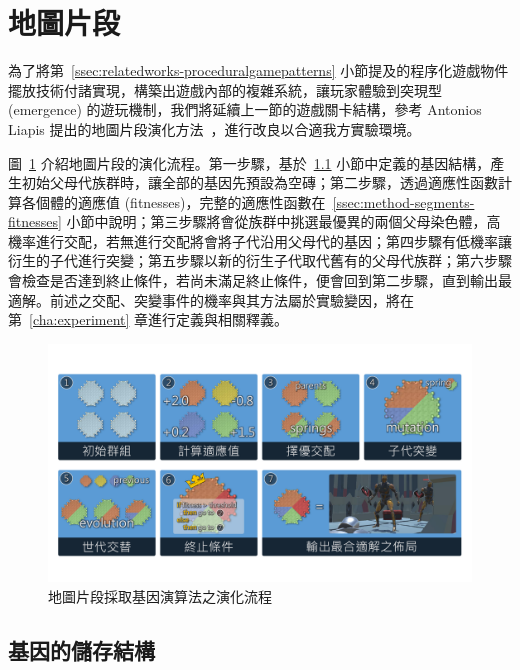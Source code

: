 \clearpage

\section{地圖片段}
\label{sec:method-segments}

為了將第~\ref{ssec:relatedworks-proceduralgamepatterns} 小節提及的程序化遊戲物件擺放技術付諸實現，構築出遊戲內部的複雜系統，讓玩家體驗到突現型 (emergence) 的遊玩機制，我們將延續上一節的遊戲關卡結構，參考 Antonios Liapis 提出的地圖片段演化方法~\cite{liapis2017multi}，進行改良以合適我方實驗環境。

圖~\ref{fig:segments-with-ga} 介紹地圖片段的演化流程。第一步驟，基於~\ref{ssec:method-segments-gene} 小節中定義的基因結構，產生初始父母代族群時，讓全部的基因先預設為空磚；第二步驟，透過適應性函數計算各個體的適應值 (fitnesses)，完整的適應性函數在~\ref{ssec:method-segments-fitnesses} 小節中說明；第三步驟將會從族群中挑選最優異的兩個父母染色體，高機率進行交配，若無進行交配將會將子代沿用父母代的基因；第四步驟有低機率讓衍生的子代進行突變；第五步驟以新的衍生子代取代舊有的父母代族群；第六步驟會檢查是否達到終止條件，若尚未滿足終止條件，便會回到第二步驟，直到輸出最適解。前述之交配、突變事件的機率與其方法屬於實驗變因，將在第~\ref{cha:experiment} 章進行定義與相關釋義。

\begin{figure}[!htb]
  \begin{center}
    \includegraphics[width=1.0\textwidth]{figures/segments-with-ga.pdf}
    \caption{地圖片段採取基因演算法之演化流程} 
    \label{fig:segments-with-ga}
  \end{center}
\end{figure}

\subsection{基因的儲存結構}
\label{ssec:method-segments-gene}

